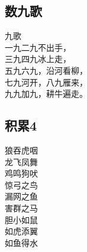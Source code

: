 \subsection{数九歌}
\begin{pinyinscope}
	\huge
	\noindent {}九歌\\
	
	\noindent 一九二九不出手，\\
	三九四九冰上走，\\
	五九六九，沿河看柳，\\
	七九河开，八九雁来，\\
	九九加九，耕牛遍走。
\end{pinyinscope}

\subsection{积累4}
\begin{pinyinscope}
	\huge
	\noindent 狼吞虎咽\\
	龙飞凤舞\\
	鸡鸣狗吠\\
	惊弓之鸟\\
	漏网之鱼\\
	害群之马\\
	胆小如鼠\\
	如虎添翼\\
	如鱼得水
\end{pinyinscope}